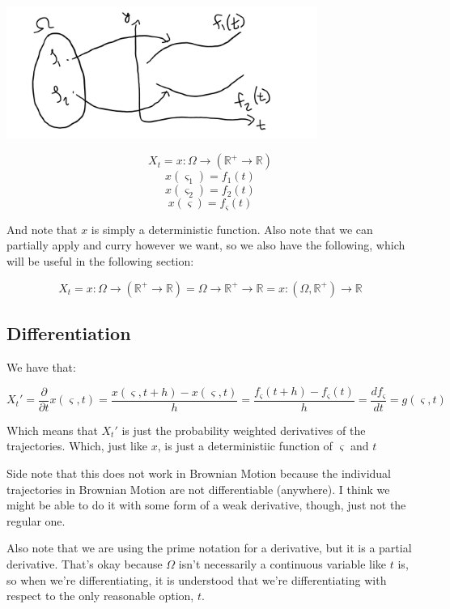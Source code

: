 \documentclass{article}
\begin{document}
\includegraphics[width=4in]{stochastic_ image.png}
\centering

$$X_t = x : \Omega \rightarrow \left(\mathbb{R}^+ \rightarrow  \mathbb{R} \right)$$ 
$$x(\varsigma_1) = f_1(t)$$
$$x(\varsigma_2) = f_2(t)$$
$$x(\varsigma) = f_\varsigma(t)$$

And note that $x$ is simply a deterministic function.  Also note that we can partially apply and curry however we want, so we also have the following, which will be useful in the following section:

$$X_t = x : \Omega \rightarrow \left(\mathbb{R}^+ \rightarrow  \mathbb{R} \right) = \Omega \rightarrow \mathbb{R}^+ \rightarrow  \mathbb{R} = x :  \left(\Omega  , \mathbb{R}^+\right)\rightarrow  \mathbb{R}$$ 

\subsection{Differentiation}
We have that:

$$X_t' = \frac{\partial}{\partial t}x(\varsigma,t)= \frac{x\left(\varsigma, t + h\right) - x\left(\varsigma, t\right)}{h} = \frac{f_\varsigma\left(t + h\right) - f_\varsigma\left(t\right)}{h} = \frac{df_\varsigma}{dt} =g\left(\varsigma, t\right)$$

Which means that $X_t'$ is just the probability weighted derivatives of the trajectories. Which, just like $x$, is just a deterministiic function of $\varsigma$ and $t$

Side note that this does not work in Brownian Motion because the individual trajectories in Brownian Motion are not differentiable (anywhere).  I think we might be able to do it with some form of a weak derivative, though, just not the regular one.

Also note that we are using the prime notation for a derivative, but it is a partial derivative. That's okay because $\Omega$ isn't necessarily a continuous variable like $t$ is, so when we're differentiating, it is understood that we're differentiating with respect to the only reasonable option, $t$.
\end{document}
